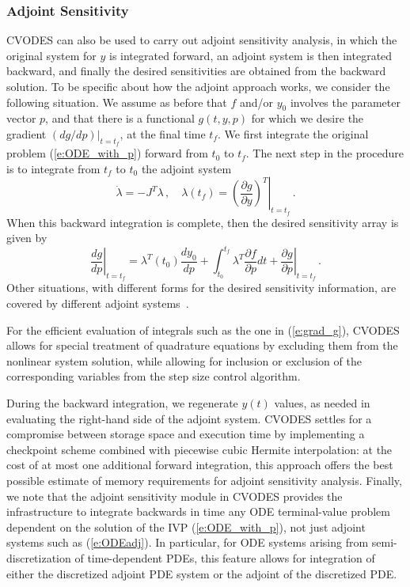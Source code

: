 \subsubsection{Adjoint Sensitivity}
CVODES can also be used to carry out adjoint sensitivity analysis, 
in which the original system for $y$ is integrated forward, 
an adjoint system is then integrated backward, and finally the desired 
sensitivities are obtained from the backward solution. 
To be specific about how the adjoint approach works, we consider
the following situation. We assume as before that $f$ and/or $y_0$
involves the parameter vector $p$, and that there is a
functional $g(t,y,p)$ for which we desire the gradient $(dg/dp)|_{t=t_f}$, 
at the final time $t_f$.
We first integrate the original problem (\ref{e:ODE_with_p}) forward 
from $t_0$ to $t_f$. The next step in the procedure is to integrate 
from $t_f$ to $t_0$ the adjoint system
\begin{equation}\label{e:ODEadj}
  \dot{\lambda} = -J^T \lambda \, , \quad
  \lambda(t_f) = \left. \left( \frac{\partial g}{\partial y}
    \right)^T \right| _{t=t_f} \, .
\end{equation}
When this backward integration is complete, then the desired
sensitivity array is given by
\begin{equation}\label{e:grad_g}
  \left. \frac{dg}{dp}\right|_{t=t_f} = 
  \lambda^T(t_0) \frac{dy_0}{dp}
  + \int_{t_0}^{t_f} \lambda^T \frac{\partial f}{\partial p} dt + 
  \left. \frac{\partial g}{\partial p} \right|_{t=t_f} \, . 
\end{equation}
Other situations, with different forms for the desired sensitivity
information, are covered by different adjoint systems~\cite{CLPS:03}.

For the efficient evaluation of integrals such as the one in (\ref{e:grad_g}),
CVODES allows for special treatment of quadrature equations by excluding them
from the nonlinear system solution, while allowing for inclusion or exclusion
of the corresponding variables from the step size control algorithm.

During the backward integration, we regenerate $y(t)$ values, as needed
in evaluating the right-hand side of the adjoint system.
%
CVODES settles for a compromise between storage space and execution time 
by implementing a checkpoint scheme combined with piecewise cubic Hermite 
interpolation: at the cost of at most one additional forward integration, 
this approach offers the best possible estimate of memory requirements for 
adjoint sensitivity analysis.
%
Finally, we note that the adjoint sensitivity module in CVODES provides 
the infrastructure to integrate backwards in time any ODE terminal-value 
problem dependent on the solution of the IVP (\ref{e:ODE_with_p}), 
not just adjoint systems such as (\ref{e:ODEadj}). In particular, 
for ODE systems arising from semi-discretization of time-dependent PDEs, 
this feature allows for integration of either the discretized adjoint 
PDE system or the adjoint of the discretized PDE.

